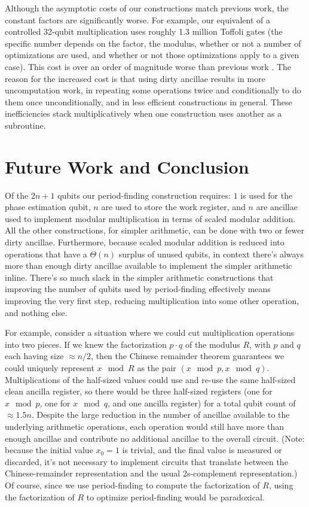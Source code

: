 \documentclass[twocolumn]{article}
\begin{document}
Although the asymptotic costs of our constructions match previous work, the constant factors are significantly worse.
For example, our equivalent of a controlled 32-qubit multiplication uses roughly 1.3 million Toffoli gates (the specific number depends on the factor, the modulus, whether or not a number of optimizations are used, and whether or not those optimizations apply to a given case).
This cost is over an order of magnitude worse than previous work \cite{haner2016}.
The reason for the increased cost is that using dirty ancillae results in more uncomputation work, in repeating some operations twice and conditionally to do them once unconditionally, and in less efficient constructions in general.
These inefficiencies stack multiplicatively when one construction uses another as a subroutine.


\section{Future Work and Conclusion} \label{sec:conclusion}

Of the $2n+1$ qubits our period-finding construction requires: $1$ is used for the phase estimation qubit, $n$ are used to store the work register, and $n$ are ancillae used to implement modular multiplication in terms of scaled modular addition.
All the other constructions, for simpler arithmetic, can be done with two or fewer dirty ancillae.
Furthermore, because scaled modular addition is reduced into operations that have a $\Theta(n)$ surplus of unused qubits, in context there's always more than enough dirty ancillae available to implement the simpler arithmetic inline.
There's so much slack in the simpler arithmetic constructions that improving the number of qubits used by period-finding effectively means improving the very first step, reducing multiplication into some other operation, and nothing else.

For example, consider a situation where we could cut multiplication operations into two pieces.
If we knew the factorization $p \cdot q$ of the modulus $R$, with $p$ and $q$ each having size $\approx n/2$, then the Chinese remainder theorem guarantees we could uniquely represent $x \mod R$ as the pair $(x \mod p, x \mod q)$.
Multiplications of the half-sized values could use and re-use the same half-sized clean ancilla register, so there would be three half-sized registers (one for $x \mod p$, one for $x \mod q$, and one ancilla register) for a total qubit count of $\approx 1.5n$.
Despite the large reduction in the number of ancillae available to the underlying arithmetic operations, each operation would still have more than enough ancillae and contribute no additional ancillae to the overall circuit.
(Note: because the initial value $x_0 = 1$ is trivial, and the final value is measured or discarded, it's not necessary to implement circuits that translate between the Chinese-remainder representation and the usual 2s-complement representation.)
Of course, since we use period-finding to compute the factorization of $R$, using the factorization of $R$ to optimize period-finding would be paradoxical.
\end{document}
